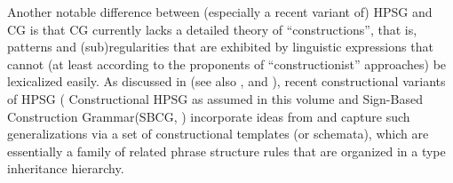 \documentclass[output=paper
                ,modfonts
 	        ,biblatex
                ,babelshorthands
                ,newtxmath
                ,draftmode
                ,colorlinks, citecolor=brown
]{langscibook}
\begin{document}



Another notable difference between (especially a recent variant of)
HPSG and CG is that CG currently lacks a detailed theory of 
``constructions'',
that is, patterns and (sub)regularities that are
exhibited by linguistic expressions that cannot (at least according to
the proponents of ``constructionist'' approaches) be lexicalized easily.
As discussed in  (see also
\citealt{Sag97a}, \citealt{Fillmore99a} and \citealt{GSag2000a-u}),  recent constructional variants
of HPSG (\eg {} Constructional HPSG as assumed in this volume and Sign-Based Construction
Grammar\indexsbcg (SBCG, \citealp*{SBK2012a}) incorporate ideas from  
\citep{FKoC88a} and capture such
generalizations via a set of constructional templates (or schemata),
which are essentially a family of related phrase structure rules that
are organized in a type inheritance hierarchy.
\end{document}
